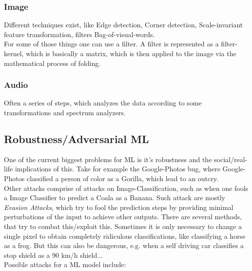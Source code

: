 \documentclass[12pt,a4paper]{article}
\begin{document}
\subsubsection{Image}

\noindent Different techniques exist, like Edge detection, Corner detection, Scale-invariant feature transformation, filters Bag-of-visual-words.\\
For some of those things one can use a filter. A filter is represented as a filter-kernel, which is basically a matrix, which is then applied to the image via the mathematical process of folding.

\subsubsection{Audio}

\noindent Often a series of steps, which analyzes the data according to some transformations and spectrum analyzers.


\subsection{Robustness/Adversarial ML}

\noindent One of the current biggest problems for ML is it's robustness and the social/real-life implications of this. Take for example the Google-Photos bug, where Google-Photos classified a person of color as a Gorilla, which lead to an outcry.\\
Other attacks comprise of attacks on Image-Classification, such as when one fools a Image Classifier to predict a Coala as a Banana. Such attack are mostly \textit{Evasion Attacks}, which try to fool the prediction steps by providing minimal perturbations of the input to achieve other outputs. There are several methods, that try to combat this/exploit this. Sometimes it is only necessary to change a single pixel to obtain completely ridiculous classifications, like classifying a horse as a frog. But this can also be dangerous, e.g. when a self driving car classifies a stop shield as a 90 km/h shield...\\[1em]
Possible attacks for a ML model include:
\end{document}
